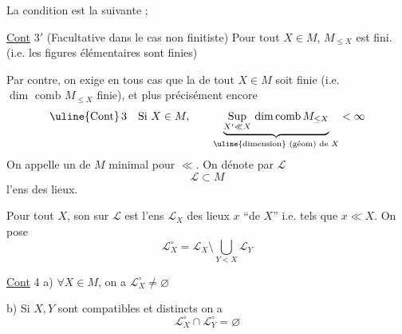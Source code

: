  La condition est la suivante ; 

\uline{Cont} $3'$ (Facultative dans le cas non finitiste) \deleted{$\forall$} Pour tout $X\in M$,   $M_{\leq X}$ est fini. (i.e. les figures élémentaires sont finies)

Par contre, on exige en tous cas que la  de tout  $X\in M$ soit finie (i.e. $\dim\text{ comb }M_{\leq X}$ finie), et plus  précisément encore
\[
\uline{\text{Cont}}\,3 \quad \text{Si } X\in M,\qquad
\underbrace{\mathop{\mathrm{Sup}}\limits_{X'\ll X}\,\mathrm{dim\,comb}\,M_{\leq X}}_{\text{\uline{dimension} (géom) de }X}<\infty
\]
On appelle  un  de $M$ minimal pour $\ll$. On dénote par $\mathcal L$
\[
\mathcal L\subset M
\]
l'ens des lieux.

Pour tout $X$, son   sur $\mathcal L$ est l'ens $\mathcal L_{X}$ des lieux $x$  ``de $X$'' i.e. tels que $x\ll X$. On pose
\[
\mathcal L_X^{\circ}=\mathcal L_X\setminus\bigcup_{Y<X}\mathcal L_Y
\]

\uline{Cont} 4 \quad a) $\forall X\in M$, on a $\mathcal L_X^{\circ}\neq\varnothing$

b) Si $X,Y$ sont compatibles et distincts on a
\[
\mathcal L_X^{\circ}\cap \mathcal L_Y^{\circ}=\varnothing
\]
